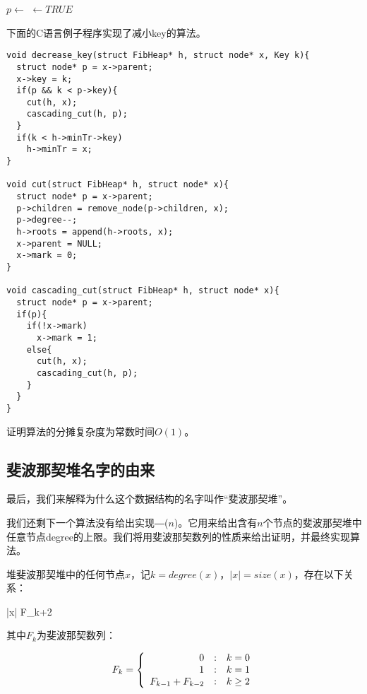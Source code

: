 \documentclass[UTF8]{article}
\begin{document}
\begin{algorithmic}[1]
  \State $p \gets $ 
      \State {} $\gets TRUE$
    \Else
      \State {}
      \State {}
    \EndIf
  \EndIf
\EndFunction
\end{algorithmic}

下面的C语言例子程序实现了减小key的算法。

\lstset{language=C}
\begin{lstlisting}
void decrease_key(struct FibHeap* h, struct node* x, Key k){
  struct node* p = x->parent;
  x->key = k;
  if(p && k < p->key){
    cut(h, x);
    cascading_cut(h, p);
  }
  if(k < h->minTr->key)
    h->minTr = x;
}

void cut(struct FibHeap* h, struct node* x){
  struct node* p = x->parent;
  p->children = remove_node(p->children, x);
  p->degree--;
  h->roots = append(h->roots, x);
  x->parent = NULL;
  x->mark = 0;
}

void cascading_cut(struct FibHeap* h, struct node* x){
  struct node* p = x->parent;
  if(p){
    if(!x->mark)
      x->mark = 1;
    else{
      cut(h, x);
      cascading_cut(h, p);
    }
  }
}
\end{lstlisting}

\begin{Exercise}
证明算法的分摊复杂度为常数时间$O(1)$。
\end{Exercise}

\subsection{斐波那契堆名字的由来}

最后，我们来解释为什么这个数据结构的名字叫作“斐波那契堆”。

我们还剩下一个算法没有给出实现―($n$)。它用来给出含有$n$个节点的斐波那契堆中任意节点degree的上限。我们将用斐波那契数列的性质来给出证明，并最终实现算法。

\begin{lemma}
\label{lemma:Fib-degree}
堆斐波那契堆中的任何节点$x$，记$k = degree(x)$，$|x| = size(x)$，存在以下关系：

\be
  |x| \geq F_{k+2}
\ee

其中$F_k$为斐波那契数列：

\[
F_k = \left \{
  \begin{array}
  {r@{\quad:\quad}l}
  0 & k = 0 \\
  1 & k = 1 \\
  F_{k-1} + F_{k-2} & k \geq 2
  \end{array}
\right.
\]
\end{lemma}
\end{document}

